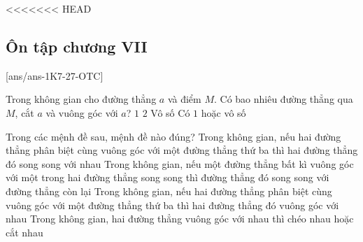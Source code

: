 <<<<<<< HEAD
\subsection{Ôn tập chương VII}
[ans/ans-1K7-27-OTC]

\begin{ex}%
	Trong không gian cho đường thẳng $a$ và điểm $ M $. Có bao nhiêu đường thẳng qua $ M $, cắt $a$ và vuông góc với $a $?
	\choice
	{$1$}
	{$2$}
	{Vô số}
	{\True Có $1$ hoặc vô số}
\end{ex}

\begin{ex}%
	Trong các mệnh đề sau, mệnh đề nào đúng?
	\choice
	{Trong không gian, nếu hai đường thẳng phân biệt cùng vuông góc với một đường thẳng thứ ba thì hai đường thẳng đó song song với nhau}
	{Trong không gian, nếu một đường thẳng bất kì vuông góc với một trong hai đường thẳng song song thì đường thẳng đó song song với đường thẳng còn lại}
	{Trong không gian, nếu hai đường thẳng phân biệt cùng vuông góc với một đường thẳng thứ ba thì hai đường thẳng đó vuông góc với nhau}
	{\True Trong không gian, hai đường thẳng vuông góc với nhau thì chéo nhau hoặc cắt nhau}
\end{ex}

